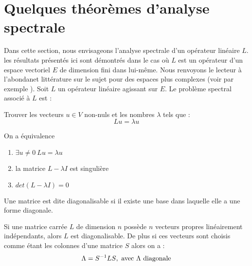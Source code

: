 \documentclass[12pt]{book}
\begin{document}
\section{Quelques th\'eor\`emes d'analyse spectrale}
Dans cette section, nous envisageons l'analyse spectrale d'un op\'erateur
lin\'eaire $L$. les r\'esultats pr\'esent\'es ici sont d\'emontr\'es dans le
cas o\`u $L$ est un op\'erateur d'un espace vectoriel $E$ de dimension fini
dans lui-m\^eme. Nous renvoyons le lecteur \`a l'abondanet litt\'erature sur
le sujet pour des espaces plus complexes (voir par exemple
\cite{ma:equad:Dautray5}). 
Soit $L$ un op\'erateur lin\'eaire agissant sur $E$.
Le probl\`eme spectral associ\'e \`a $L$ est :
\begin{prob}
Trouver les vecteurs $u\in V$ non-nuls  et les nombres $\lambda$ tels
que :
\begin{equation}
Lu=\lambda u
\end{equation}
\end{prob}
\begin{thm}
On a \'equivalence
\begin{enumerate}
\item $\exists u \neq 0 \: Lu=\lambda u$
\item la matrice $L-\lambda I$ est singuli\`ere
\item $det(L-\lambda I)=0$
\end{enumerate}
\end{thm}
Une matrice est dite diagonalisable si il existe une base dans
laquelle elle a une forme diagonale\cite{ma:algeb:Strang76}.
\begin{thm}
Si une matrice carr\'ee $L$ de dimension $n$ poss\`ede $n$ vecteurs propres
lin\'eairement ind\'ependants, alors $L$ est diagonalisable.
De plus si ces vecteurs sont choisis comme \'etant les colonnes d'une
matrice $S$ alors on a :
\begin{equation}
\Lambda = S^{-1} L S {\rm,\ avec\ \Lambda\  diagonale}
\end{equation}
\end{thm}
\end{document}
